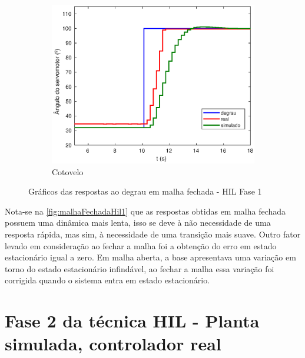 \begin{figure}[h!]\ContinuedFloat
  \begin{subfigure}{\textwidth}
    \centering
    \includegraphics[width = 0.55\columnwidth]{Imagens/forearm_mf_simul}
    \caption{Cotovelo}
    \label{fig:forearm_mf_simul}
  \end{subfigure}%
  \caption{Gráficos das respostas ao degrau em malha fechada - HIL Fase 1}
  \label{fig:malhaFechadaHil1}
\end{figure}


Nota-se na \autoref{fig:malhaFechadaHil1} que as respostas obtidas em malha fechada possuem uma dinâmica mais lenta,
isso se deve à não necessidade de uma resposta rápida, mas sim, à necessidade de uma transição mais suave. Outro fator
levado em consideração ao fechar a malha foi a obtenção do erro em estado estacionário igual a zero. Em malha aberta, a base 
apresentava uma variação em torno do estado estacionário infindável, ao fechar a malha essa variação foi corrigida quando o
sistema entra em estado estacionário.

\section{Fase 2 da técnica HIL - Planta simulada, controlador real}

